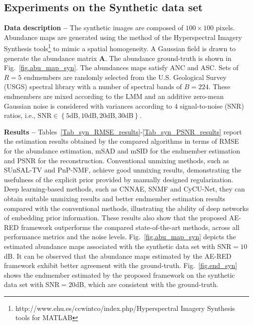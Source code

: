 \documentclass[journal,a4paper]{IEEEtran}
\newcommand{\MATabund}{\mathbf{A}}
\begin{document}
\subsection{Experiments on the Synthetic data set}\label{subsec:expe_synthetic}
\noindent \textbf{Data description --} The synthetic images are composed of $100\times 100$ pixels. Abundance maps are generated using the method of the Hyperspectral Imagery Synthesis tools\footnote{http://www.ehu.es/ccwintco/index.php/Hyperspectral Imagery Synthesis
tools for MATLAB} to mimic a spatial homogeneity. A Gaussian field is drawn to generate the abundance matrix $\MATabund$. The abundance ground-truth is shown in Fig.~\ref{fig.abu_map_syn}.
The abundances maps satisfy ANC and ASC. Sets of $R=5$ endmembers are randomly selected from the U.S. Geological Survey (USGS) spectral library with a number of spectral bands of $B=224$. These endmembers are mixed according to the LMM and an additive zero-mean Gaussian noise is considered with variances according to $4$ signal-to-noise (SNR) ratios, i.e., $\mathrm{SNR} \in \left\{5\mathrm{dB}, 10\mathrm{dB}, 20\mathrm{dB}, 30\mathrm{dB}\right\}$.

\noindent \textbf{Results -- }
Tables~\ref{Tab_syn_RMSE_results}-\ref{Tab_syn_PSNR_results} report the estimation results obtained by the compared algorithms in terms of RMSE for the abundance estimation, mSAD and mSID for the endmember estimation and PSNR for the reconstruction. Conventional unmixing methods, such as SUnSAL-TV and PnP-NMF, achieve good unmixing results, demonstrating the usefulness of the explicit prior provided by manually designed regularization. Deep learning-based methods, such as CNNAE, SNMF and CyCU-Net, they can obtain suitable unmixing results and better endmember estimation results compared with the conventional methods, illustrating the ability of deep networks of embedding prior information. These results also show that the proposed AE-RED framework outperforms the compared state-of-the-art methods, across all performance metrics and the noise levels. Fig.~\ref{fig.abu_map_syn} depicts the estimated abundance maps associated with the synthetic data set with SNR$=10$dB. It can be observed that the abundance maps estimated by the AE-RED framework exhibit better agreement with the ground-truth. Fig.~\ref{fig.end_syn} shows the endmember estimated by the proposed framework on the synthetic data set with SNR$=20$dB, which are consistent with the ground-truth.


\end{document}
